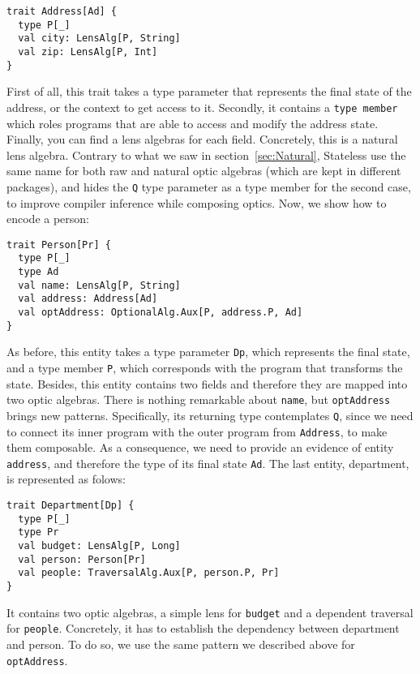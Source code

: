 \documentclass[preview, 3p]{elsarticle}
\begin{document}
\begin{lstlisting}
trait Address[Ad] {
  type P[_]
  val city: LensAlg[P, String]
  val zip: LensAlg[P, Int]
}
\end{lstlisting}

First of all, this trait takes a type parameter that represents the final state
of the address, or the context to get access to it. Secondly, it contains a
\lstinline{type member} which roles programs that are able to access and modify
the address state. Finally, you can find a lens algebras for each field.
Concretely, this is a natural lens algebra. Contrary to what we saw in
section~\ref{sec:Natural}, Stateless use the same name for both raw and natural
optic algebras (which are kept in different packages), and hides the
\lstinline{Q} type parameter as a type member for the second case, to improve
compiler inference while composing optics. Now, we show how to encode a person:

\begin{lstlisting}
trait Person[Pr] {
  type P[_]
  type Ad
  val name: LensAlg[P, String]
  val address: Address[Ad]
  val optAddress: OptionalAlg.Aux[P, address.P, Ad]
}
\end{lstlisting}

As before, this entity takes a type parameter \lstinline{Dp}, which represents
the final state, and a type member \lstinline{P}, which corresponds with the
program that transforms the state. Besides, this entity contains two fields and
therefore they are mapped into two optic algebras. There is nothing remarkable
about \lstinline{name}, but \lstinline{optAddress} brings new patterns.
Specifically, its returning type contemplates \lstinline{Q}, since we need to
connect its inner program with the outer program from \lstinline{Address}, to
make them composable. As a consequence, we need to provide an evidence of entity
\lstinline{address}, and therefore the type of its final state \lstinline{Ad}.
The last entity, department, is represented as folows:

\begin{lstlisting}
trait Department[Dp] {
  type P[_]
  type Pr
  val budget: LensAlg[P, Long]
  val person: Person[Pr]
  val people: TraversalAlg.Aux[P, person.P, Pr]
}
\end{lstlisting}

It contains two optic algebras, a simple lens for \lstinline{budget} and a
dependent traversal for \lstinline{people}. Concretely, it has to establish the
dependency between department and person. To do so, we use the same pattern we
described above for \lstinline{optAddress}.
\end{document}
